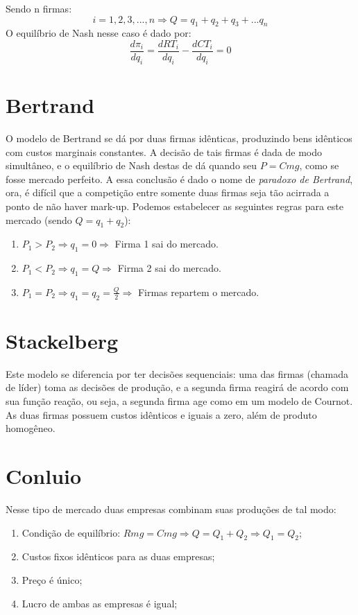 \documentclass[12pt,a4paper,oneside,brazil]{abntex2}
\begin{document}
Sendo n firmas:
\[ i = 1, 2 , 3, ..., n \Rightarrow Q = q_1 + q_2 + q_3 + ... q_n\]
O equilíbrio de Nash nesse caso é dado por:
\[  \frac{d \pi_i}{d q_i} = \frac{d RT_i}{d q_i} - \frac{d CT_i}{d q_i} = 0\]

\section{Bertrand}
O modelo de Bertrand se dá por duas firmas idênticas, produzindo bens idênticos com custos marginais constantes. A decisão de tais firmas é dada de modo simultâneo,  e o equilíbrio de Nash destas de dá quando seu $P = Cmg$, como se fosse mercado perfeito. A essa conclusão é dado o nome de \emph{paradoxo de Bertrand}, ora, é difícil que a competição entre somente duas firmas seja tão acirrada a ponto de não haver mark-up. Podemos estabelecer as seguintes regras para este mercado (sendo $Q = q_1 + q_2$):
\begin{enumerate}
\item $P_1 > P_2  \Rightarrow q_1 = 0 \Rightarrow$ Firma 1 sai do mercado.
\item $P_1 <  P_2  \Rightarrow  q_1 = Q \Rightarrow$ Firma 2 sai do mercado.
\item $ P_1 = P_2 \Rightarrow q_1 = q_2 = \frac{Q}{2} \Rightarrow$ Firmas repartem o mercado.
\end{enumerate}

\section{Stackelberg}
Este modelo se diferencia por ter decisões sequenciais: uma das firmas (chamada de líder) toma as decisões de produção, e a segunda firma reagirá de acordo com sua função reação, ou seja, a segunda firma age como em um modelo de Cournot. As duas firmas possuem custos idênticos e iguais a zero, além de produto homogêneo. 

\section{Conluio}
Nesse tipo de mercado duas empresas combinam suas produções de tal modo:

\begin{enumerate}
\item Condição de equilíbrio: $ Rmg =Cmg \Rightarrow Q = Q_1 + Q_2 \Rightarrow Q_1 = Q_2 $;
\item Custos fixos idênticos para as duas empresas;
\item Preço é único;
\item Lucro de ambas as empresas é igual;
\end{enumerate}
\end{document}
